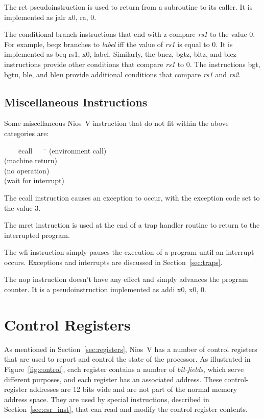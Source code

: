 \documentclass[11pt, twoside, pdftex]{article}
\newenvironment{ctabbing}%
{\begin{center}\begin{minipage}{\textwidth}\begin{tabbing}}
{\end{tabbing}\end{minipage}\end{center}}
\begin{document}
The {\sf ret} pseudoinstruction is used to return from a subroutine to its caller. It is
implemented as {\sf jalr x0, ra, 0}.

The conditional branch instructions that end with {\sf z} compare {\it rs1} to the value 0.
For example, {\sf beqz} branches to {\it label} iff the value of {\it rs1} is equal to 0. 
It is implemented as {\sf beq rs1, x0, label}. Similarly, the {\sf bnez}, {\sf bgtz},
{\sf bltz}, and {\sf blez} instructions provide other conditions that compare {\it rs1} to 0.
The instructions {\sf bgt}, {\sf bgtu}, {\sf ble}, and {\sf bleu} provide additional 
conditions that compare {\it rs1} and {\it rs2}. 

\subsection{Miscellaneous Instructions}
\label{sec:misc}

Some miscellaneous Nios~V instruction that do not fit within the above categories are:
\begin{ctabbing}
~~~~\={\sf ecall}~~~~\=\kill
{} \>(environment call)\\
 \>(machine return)\\
 \>(no operation)\\
 \>(wait for interrupt)\\
\end{ctabbing}
\vspace{-\baselineskip}
The {\sf ecall} instruction causes an exception to occur, with the exception code set to 
the value 3. 

The {\sf mret} instruction is used at the end of a trap handler routine to return to the 
interrupted program.  

The {\sf wfi} instruction simply pauses the execution of a program until an interrupt
occurs. Exceptions and interrupts are discussed in Section~\ref{sec:traps}.

The {\sf nop} instruction doesn't have any effect and simply advances the program counter. 
It is a pseudoinstruction implemented as {\sf addi x0, x0, 0}.

\section{Control Registers}
\label{sec:control}

As mentioned in Section~\ref{sec:registers}, Nios~V has a number of control registers
that are used to report and control the state of the processor. As illustrated in 
Figure~\ref{fig:control}, each register contains a number of {\it bit-fields}, which serve 
different purposes, and each register has an associated address. These control-register
addresses are 12 bits wide and are not part of the normal memory address space. They  
are used by special instructions, described in Section~\ref{sec:csr_inst}, that can read 
and modify the control register contents. 
\end{document}
